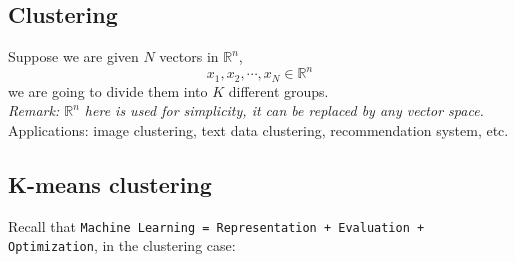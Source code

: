 \documentclass[11pt]{article}
\newcommand{\R}{\mathbb{R}}
\begin{document}
\subsection{Clustering}
Suppose we are given $N$ vectors in $\R^n$, $$x_1, x_2, \cdots, x_N \in \R^n$$ we are going to divide them into $K$ different groups.\\
\textit{Remark: $\R^n$ here is used for simplicity, it can be replaced by any vector space.}\\
Applications: image clustering, text data clustering, recommendation system, etc.
\subsection{K-means clustering}
Recall that \texttt{Machine Learning = Representation + Evaluation + Optimization}, in the clustering case:
\end{document}
